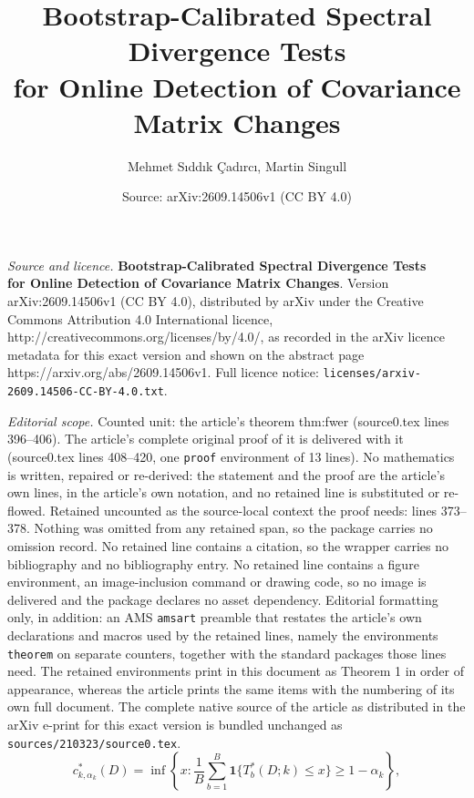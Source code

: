 \documentclass[10pt,a4paper]{amsart}
\title{\textbf{Bootstrap-Calibrated Spectral Divergence Tests\\ for Online Detection of Covariance Matrix Changes}}
\author{Mehmet S\i dd\i k \c{C}ad\i rc\i, Martin Singull}
\date{Source: arXiv:2609.14506v1 (CC BY 4.0)}
\newcommand{\one}{\mathbf{1}}
\begin{document}
\maketitle

\noindent\emph{Source and licence.} \textbf{Bootstrap-Calibrated Spectral Divergence Tests\\ for Online Detection of Covariance Matrix Changes}. Version arXiv:2609.14506v1 (CC BY 4.0), distributed by arXiv under the Creative Commons Attribution 4.0 International licence, http://creativecommons.org/licenses/by/4.0/, as recorded in the arXiv licence metadata for this exact version and shown on the abstract page https://arxiv.org/abs/2609.14506v1. Full licence notice: \texttt{licenses/arxiv-2609.14506-CC-BY-4.0.txt}.\par\smallskip

\noindent\textit{Editorial scope.} Counted unit: the article's theorem thm:fwer (source0.tex lines 396--406). The article's complete original proof of it is delivered with it (source0.tex lines 408--420, one \texttt{proof} environment of 13 lines). No mathematics is written, repaired or re-derived: the statement and the proof are the article's own lines, in the article's own notation, and no retained line is substituted or re-flowed.  Retained uncounted as the source-local context the proof needs: lines 373--378.  Nothing was omitted from any retained span, so the package carries no omission record.  No retained line contains a citation, so the wrapper carries no bibliography and no bibliography entry.  No retained line contains a figure environment, an image-inclusion command or drawing code, so no image is delivered and the package declares no asset dependency.  Editorial formatting only, in addition: an AMS \texttt{amsart} preamble that restates the article's own declarations and macros used by the retained lines, namely the environments \texttt{theorem} on separate counters, together with the standard packages those lines need.  The retained environments print in this document as Theorem 1 in order of appearance, whereas the article prints the same items with the numbering of its own full document.  The complete native source of the article as distributed in the arXiv e-print for this exact version is bundled unchanged as \texttt{sources/210323/source0.tex}.
\begin{equation}
c_{k,\alpha_{k}}^{*}(D)
= \inf\!\left\{x:\frac{1}{B}\sum_{b=1}^{B}\one\bigl\{T_{b}^{*}(D;k)\leq x\bigr\}
  \geq 1-\alpha_{k}\right\},
\label{eq:boot-crit}
\end{equation}
\end{document}
